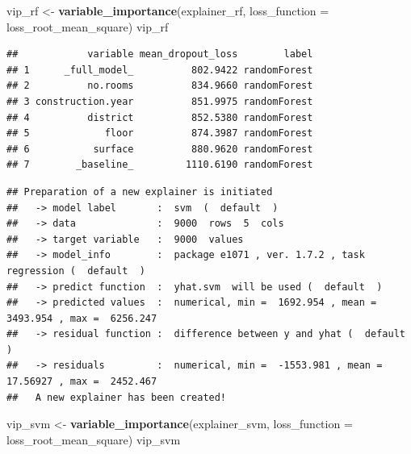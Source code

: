 \documentclass[12pt,]{krantz}
\newenvironment{Shaded}{\begin{snugshade}}{\end{snugshade}}
\newcommand{\DataTypeTok}[1]{\textcolor[rgb]{0.13,0.29,0.53}{#1}}
\newcommand{\DecValTok}[1]{\textcolor[rgb]{0.00,0.00,0.81}{#1}}
\newcommand{\KeywordTok}[1]{\textcolor[rgb]{0.13,0.29,0.53}{\textbf{#1}}}
\newcommand{\NormalTok}[1]{#1}
\newcommand{\OperatorTok}[1]{\textcolor[rgb]{0.81,0.36,0.00}{\textbf{#1}}}
\newcommand{\OtherTok}[1]{\textcolor[rgb]{0.56,0.35,0.01}{#1}}
\newcommand{\StringTok}[1]{\textcolor[rgb]{0.31,0.60,0.02}{#1}}
\begin{document}
\begin{Shaded}
\begin{Highlighting}[]
\NormalTok{vip_rf <-}\StringTok{ }\KeywordTok{variable_importance}\NormalTok{(explainer_rf, }
            \DataTypeTok{loss_function =}\NormalTok{ loss_root_mean_square)}
\NormalTok{vip_rf}
\end{Highlighting}
\end{Shaded}

\begin{verbatim}
##            variable mean_dropout_loss        label
## 1      _full_model_          802.9422 randomForest
## 2          no.rooms          834.9660 randomForest
## 3 construction.year          851.9975 randomForest
## 4          district          852.5380 randomForest
## 5             floor          874.3987 randomForest
## 6           surface          880.9620 randomForest
## 7        _baseline_         1110.6190 randomForest
\end{verbatim}

\begin{Shaded}
\end{Shaded}

\begin{verbatim}
## Preparation of a new explainer is initiated
##   -> model label       :  svm  (  default  )
##   -> data              :  9000  rows  5  cols 
##   -> target variable   :  9000  values 
##   -> model_info        :  package e1071 , ver. 1.7.2 , task regression (  default  ) 
##   -> predict function  :  yhat.svm  will be used (  default  )
##   -> predicted values  :  numerical, min =  1692.954 , mean =  3493.954 , max =  6256.247  
##   -> residual function :  difference between y and yhat (  default  )
##   -> residuals         :  numerical, min =  -1553.981 , mean =  17.56927 , max =  2452.467  
##   A new explainer has been created!
\end{verbatim}

\begin{Shaded}
\begin{Highlighting}[]
\NormalTok{vip_svm <-}\StringTok{ }\KeywordTok{variable_importance}\NormalTok{(explainer_svm, }
            \DataTypeTok{loss_function =}\NormalTok{ loss_root_mean_square)}
\NormalTok{vip_svm}
\end{Highlighting}
\end{Shaded}
\end{document}
